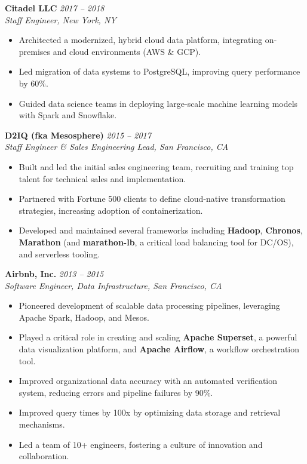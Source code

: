 \documentclass[margin,line]{resume}
\begin{document}
\begin{resume}
\textbf{Citadel LLC} \hfill \textit{2017 -- 2018} \\
\textit{Staff Engineer, New York, NY}
\begin{itemize}[leftmargin=0.5cm]
    \item Architected a modernized, hybrid cloud data platform, integrating on-premises and cloud environments (AWS \& GCP).
    \item Led migration of data systems to PostgreSQL, improving query performance by 60\%.
    \item Guided data science teams in deploying large-scale machine learning models with Spark and Snowflake.
\end{itemize}

\textbf{D2IQ (fka Mesosphere)} \hfill \textit{2015 -- 2017} \\
\textit{Staff Engineer \& Sales Engineering Lead, San Francisco, CA}
\begin{itemize}[leftmargin=0.5cm]
    \item Built and led the initial sales engineering team, recruiting and training top talent for technical sales and implementation.
    \item Partnered with Fortune 500 clients to define cloud-native transformation strategies, increasing adoption of containerization.
    \item Developed and maintained several frameworks including \textbf{Hadoop}, \textbf{Chronos}, \textbf{Marathon} (and \textbf{marathon-lb}, a critical load balancing tool for DC/OS), and serverless tooling.
\end{itemize}

\textbf{Airbnb, Inc.} \hfill \textit{2013 -- 2015} \\
\textit{Software Engineer, Data Infrastructure, San Francisco, CA}
\begin{itemize}[leftmargin=0.5cm]
    \item Pioneered development of scalable data processing pipelines, leveraging Apache Spark, Hadoop, and Mesos.
    \item Played a critical role in creating and scaling \textbf{Apache Superset}, a powerful data visualization platform, and \textbf{Apache Airflow}, a workflow orchestration tool.
    \item Improved organizational data accuracy with an automated verification system, reducing errors and pipeline failures by 90\%.
    \item Improved query times by 100x by optimizing data storage and retrieval mechanisms.
    \item Led a team of 10+ engineers, fostering a culture of innovation and collaboration.
\end{itemize}


\end{resume}
\end{document}
